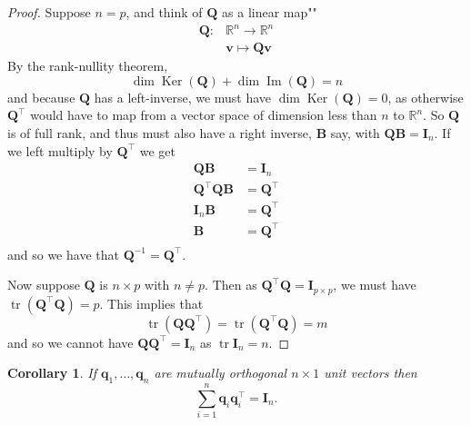 \documentclass[]{book}
\newtheorem{corollary}{Corollary}[chapter]
\theoremstyle{definition}
\theoremstyle{definition}
\theoremstyle{definition}
\theoremstyle{remark}
\begin{document}
\begin{proof}
{}Suppose \(n=p\), and think of \(\boldsymbol Q\) as a linear map""
\begin{align*}
\boldsymbol Q: &\mathbb{R}^n \rightarrow \mathbb{R}^n\\
&\boldsymbol v\mapsto \boldsymbol Q\boldsymbol v
\end{align*}
By the rank-nullity theorem,
\[\dim \operatorname{Ker}(\boldsymbol Q) + \dim \operatorname{Im}(\boldsymbol Q) =n\]
and because \(\boldsymbol Q\) has a left-inverse, we must have \(\dim \operatorname{Ker}(\boldsymbol Q)=0\), as otherwise \(\boldsymbol Q^\top\) would have to map from a vector space of dimension less than \(n\) to \(\mathbb{R}^n\). So \(\boldsymbol Q\) is of full rank, and thus must also have a right inverse, \(\boldsymbol B\) say, with \(\boldsymbol Q\boldsymbol B=\mathbf I_n\). If we left multiply by \(\boldsymbol Q^\top\) we get
\begin{align*}
\boldsymbol Q\boldsymbol B&=\mathbf I_n\\
\boldsymbol Q^\top\boldsymbol Q\boldsymbol B&=\boldsymbol Q^\top\\
\mathbf I_n \boldsymbol B&= \boldsymbol Q^\top\\
\boldsymbol B&= \boldsymbol Q^\top\\
\end{align*}
and so we have that \(\boldsymbol Q^{-1}=\boldsymbol Q^\top\).

Now suppose \(\boldsymbol Q\) is \(n \times p\) with \(n\not = p\). Then as
\(\boldsymbol Q^\top \boldsymbol Q=\mathbf I_{p\times p}\), we must have \(\operatorname{tr}(\boldsymbol Q^\top \boldsymbol Q)=p\). This implies that
\[\operatorname{tr}(\boldsymbol Q\boldsymbol Q^\top)=\operatorname{tr}(\boldsymbol Q^\top \boldsymbol Q)=m\] and so
we cannot have \(\boldsymbol Q\boldsymbol Q^\top=\mathbf I_{n}\) as \(\operatorname{tr}{\mathbf I_{n}}=n\).
\end{proof}

\begin{corollary}
\protect\hypertarget{cor:two1}{}{\label{cor:two1} }If \(\boldsymbol q_1, \ldots , \boldsymbol q_n\) are mutually orthogonal \(n \times 1\) unit vectors then
\[
\sum_{i=1}^n \boldsymbol q_i \boldsymbol q_i^\top = {\mathbf I}_n.
\]
\end{corollary}
\end{document}
